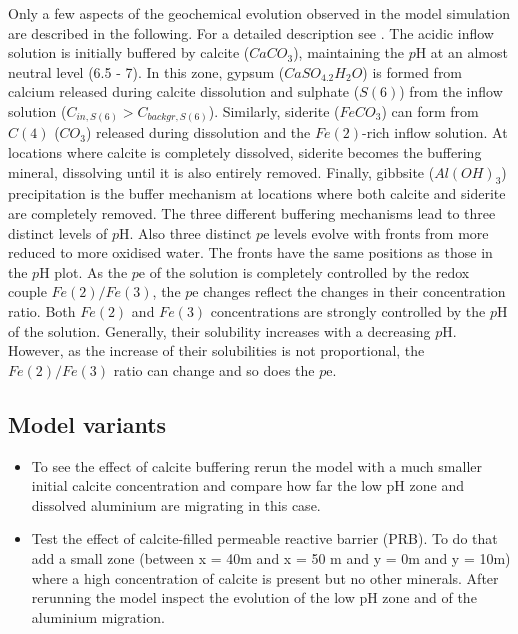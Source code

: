 \par Only a few aspects of the geochemical evolution
observed in the model simulation are described
in the following. For a detailed description see \cite{walt94a}.
The acidic inflow solution is initially buffered by 
calcite ($CaCO_3$), maintaining the $p$H
at an almost neutral level (6.5 - 7). In this zone, gypsum
($CaSO_4.2H_2O$) is formed from calcium released during calcite
dissolution and sulphate ($S(6)$) from the inflow solution
($C_{in,S(6)} > C_{backgr,S(6)}$). Similarly, siderite ($FeCO_3$)
can form from $C(4)$ ($CO_3$) released during dissolution and the
$Fe(2)$-rich inflow solution. At locations where calcite is
completely dissolved, siderite becomes the buffering mineral,
dissolving until it is also entirely removed. Finally, gibbsite
($Al(OH)_3$) precipitation is the buffer mechanism at locations
where both calcite and siderite are completely removed. The three
different buffering mechanisms lead to three distinct levels of
$p$H. Also three distinct
$p$e levels evolve with fronts from more reduced to more oxidised
water. The fronts have the same positions as those in the $p$H
plot. As the $p$e of the solution is completely controlled by the
redox couple $Fe(2)/Fe(3)$, the $p$e changes reflect the changes
in their concentration ratio. Both $Fe(2)$ and $Fe(3)$
concentrations are strongly controlled by the $p$H of the
solution. Generally, their solubility increases with a decreasing
$p$H. However, as the increase of their solubilities is not
proportional, the $Fe(2)/Fe(3)$ ratio can change and so does the
$p$e.

\subsection[Model variants]{Model variants}

\begin{itemize}

\item To see the effect of calcite buffering rerun the model with a much 
smaller initial calcite concentration and compare how far the 
low pH zone and dissolved aluminium are migrating in this case.

\item Test the effect of calcite-filled permeable reactive barrier (PRB).
To do that add a small zone (between x = 40m and x = 50 m and y = 0m and y = 10m) 
where a high concentration of calcite is present but no other minerals. 
After rerunning the model inspect the evolution of the low pH zone and of the aluminium migration.

\end{itemize}

